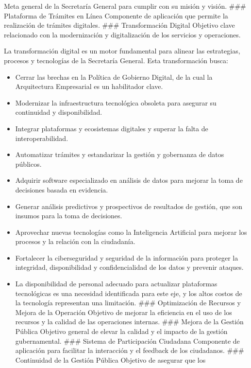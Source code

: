 \documentclass[
	a4paper, %
	12pt, %
]{include/CSSullivanBusinessReport}
\def\tightlist{}
\begin{document}
Meta general de la Secretaría General para cumplir con su misión y
visión. \#\#\# Plataforma de Trámites en Línea Componente de aplicación
que permite la realización de trámites digitales. \#\#\# Transformación
Digital Objetivo clave relacionado con la modernización y digitalización
de los servicios y operaciones.

La transformación digital es un motor fundamental para alinear las
estrategias, procesos y tecnologías de la Secretaría General. Esta
transformación busca:

\begin{itemize}
\tightlist
\item
  Cerrar las brechas en la Política de Gobierno Digital, de la cual la
  Arquitectura Empresarial es un habilitador clave.
\item
  Modernizar la infraestructura tecnológica obsoleta para asegurar su
  continuidad y disponibilidad.
\item
  Integrar plataformas y ecosistemas digitales y superar la falta de
  interoperabilidad.
\item
  Automatizar trámites y estandarizar la gestión y gobernanza de datos
  públicos.
\item
  Adquirir software especializado en análisis de datos para mejorar la
  toma de decisiones basada en evidencia.
\item
  Generar análisis predictivos y prospectivos de resultados de gestión,
  que son insumos para la toma de decisiones.
\item
  Aprovechar nuevas tecnologías como la Inteligencia Artificial para
  mejorar los procesos y la relación con la ciudadanía.
\item
  Fortalecer la ciberseguridad y seguridad de la información para
  proteger la integridad, disponibilidad y confidencialidad de los datos
  y prevenir ataques.
\item
  La disponibilidad de personal adecuado para actualizar plataformas
  tecnológicas es una necesidad identificada para este eje, y los altos
  costos de la tecnología representan una limitación. \#\#\#
  Optimización de Recursos y Mejora de la Operación Objetivo de mejorar
  la eficiencia en el uso de los recursos y la calidad de las
  operaciones internas. \#\#\# Mejora de la Gestión Pública Objetivo
  general de elevar la calidad y el impacto de la gestión gubernamental.
  \#\#\# Sistema de Participación Ciudadana Componente de aplicación
  para facilitar la interacción y el feedback de los ciudadanos. \#\#\#
  Continuidad de la Gestión Pública Objetivo de asegurar que los

\end{itemize}
\end{document}

